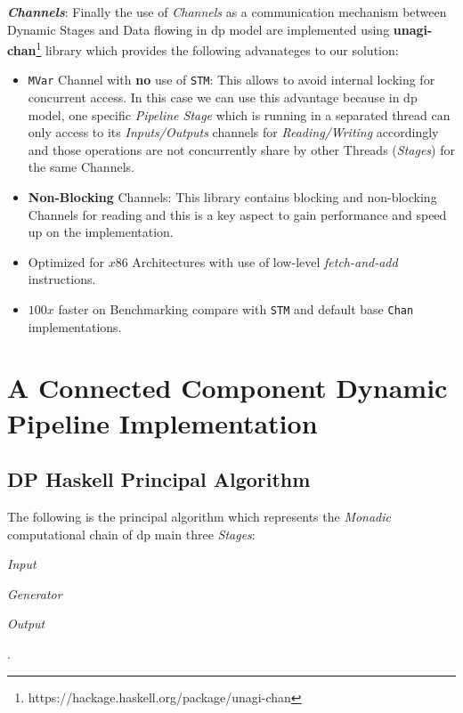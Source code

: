 \documentclass[preprint]{elsarticle}
\begin{document}
\textbf{\textit{Channels}}\label{section:channels}: Finally the use of \emph{Channels} as a communication mechanism between Dynamic Stages and Data flowing in \acrshort{dp} model are implemented using \textbf{unagi-chan}\footnote{https://hackage.haskell.org/package/unagi-chan} library which provides the following advanateges to our solution:

\begin{itemize}
  \item \texttt{MVar} Channel with \textbf{no} use of \texttt{STM}: This allows to avoid internal locking for concurrent access. In this case
  we can use this advantage because in \acrshort{dp} model, one specific \textit{Pipeline Stage} which is running in a separated thread can only access to its \textit{Inputs/Outputs} channels for \textit{Reading/Writing} accordingly 
  and those operations are not concurrently share by other Threads (\textit{Stages}) for the same Channels.  
  \item \textbf{Non-Blocking} Channels: This library contains blocking and non-blocking Channels for reading and this is a key aspect to gain performance and speed up on the implementation.
  \item Optimized for $x86$ Architectures with use of low-level \textit{fetch-and-add} instructions.
  \item $100x$ faster on Benchmarking compare with \texttt{STM} and default base \texttt{Chan} implementations.
\end{itemize}

\section{A Connected Component Dynamic Pipeline Implementation}

\subsection{\textbf{DP Haskell Principal Algorithm}}

The following is the principal algorithm which represents the \textit{Monadic} computational chain of \acrshort{dp} main three \textit{Stages}: \begin{inparaenum}[i\upshape)]
\item \emph{Input}
\item \emph{Generator}
\item \emph{Output}
 \end{inparaenum}.
\end{document}
